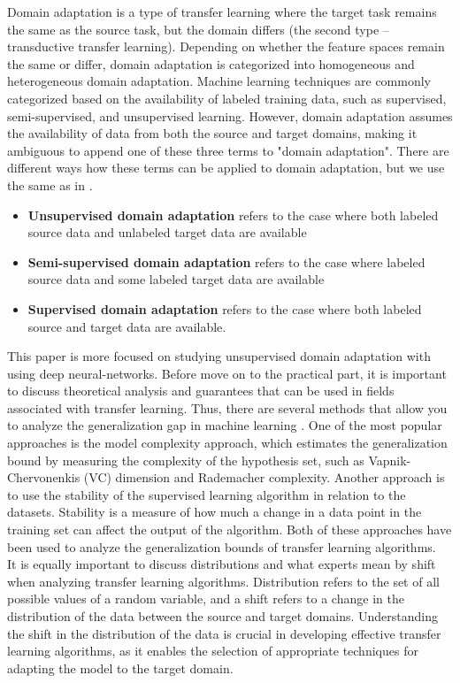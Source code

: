 Domain adaptation is a type of transfer learning where the target task remains the same as the source task, but the domain differs (the second type -- transductive transfer learning). Depending on whether the feature spaces remain the same or differ, domain adaptation is categorized into homogeneous and heterogeneous domain adaptation. Machine learning techniques are commonly categorized based on the availability of labeled training data, such as supervised, semi-supervised, and unsupervised learning. However, domain adaptation assumes the availability of data from both the source and target domains, making it ambiguous to append one of these three terms to "domain adaptation". There are different ways how these terms can be applied to domain adaptation, but we use the same as in \cite{wilson2020survey}. 

\begin{itemize}
    \item \textbf{Unsupervised domain adaptation} refers to the case where both labeled source data and unlabeled target data are available
    \item \textbf{Semi-supervised domain adaptation} refers to the case where labeled source data and some labeled target data are available
    \item \textbf{Supervised domain adaptation} refers to the case where both labeled source and target data are available.
\end{itemize}

This paper is more focused on studying unsupervised domain adaptation with using deep neural-networks. Before move on to the practical part, it is important to discuss theoretical analysis and guarantees that can be used in fields associated with transfer learning. Thus, there are several methods that allow you to analyze the generalization gap in machine learning \cite{wang2018theoretical}. One of the most popular approaches is the model complexity approach, which estimates the generalization bound by measuring the complexity of the hypothesis set, such as Vapnik-Chervonenkis (VC) dimension and Rademacher complexity. Another approach is to use the stability of the supervised learning algorithm in relation to the datasets. Stability is a measure of how much a change in a data point in the training set can affect the output of the algorithm. Both of these approaches have been used to analyze the generalization bounds of transfer learning algorithms.\\

It is equally important to discuss distributions and what experts mean by shift when analyzing transfer learning algorithms. Distribution refers to the set of all possible values of a random variable, and a shift refers to a change in the distribution of the data between the source and target domains. Understanding the shift in the distribution of the data is crucial in developing effective transfer learning algorithms, as it enables the selection of appropriate techniques for adapting the model to the target domain. \\

